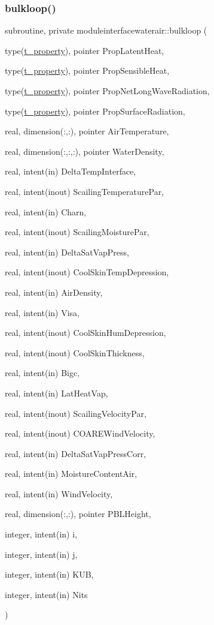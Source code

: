 \subsubsection{\texorpdfstring{bulkloop()}{bulkloop()}}
{\footnotesize\ttfamily subroutine, private moduleinterfacewaterair\+::bulkloop (\begin{DoxyParamCaption}\item[{type(\mbox{\hyperlink{structmoduleinterfacewaterair_1_1t__property}{t\+\_\+property}}), pointer}]{Prop\+Latent\+Heat,  }\item[{type(\mbox{\hyperlink{structmoduleinterfacewaterair_1_1t__property}{t\+\_\+property}}), pointer}]{Prop\+Sensible\+Heat,  }\item[{type(\mbox{\hyperlink{structmoduleinterfacewaterair_1_1t__property}{t\+\_\+property}}), pointer}]{Prop\+Net\+Long\+Wave\+Radiation,  }\item[{type(\mbox{\hyperlink{structmoduleinterfacewaterair_1_1t__property}{t\+\_\+property}}), pointer}]{Prop\+Surface\+Radiation,  }\item[{real, dimension(\+:,\+:), pointer}]{Air\+Temperature,  }\item[{real, dimension(\+:,\+:,\+:), pointer}]{Water\+Density,  }\item[{real, intent(in)}]{Delta\+Temp\+Interface,  }\item[{real, intent(inout)}]{Scailing\+Temperature\+Par,  }\item[{real, intent(in)}]{Charn,  }\item[{real, intent(inout)}]{Scailing\+Moisture\+Par,  }\item[{real, intent(in)}]{Delta\+Sat\+Vap\+Press,  }\item[{real, intent(inout)}]{Cool\+Skin\+Temp\+Depression,  }\item[{real, intent(in)}]{Air\+Density,  }\item[{real, intent(in)}]{Visa,  }\item[{real, intent(inout)}]{Cool\+Skin\+Hum\+Depression,  }\item[{real, intent(inout)}]{Cool\+Skin\+Thickness,  }\item[{real, intent(in)}]{Bigc,  }\item[{real, intent(in)}]{Lat\+Heat\+Vap,  }\item[{real, intent(inout)}]{Scailing\+Velocity\+Par,  }\item[{real, intent(inout)}]{C\+O\+A\+R\+E\+Wind\+Velocity,  }\item[{real, intent(in)}]{Delta\+Sat\+Vap\+Press\+Corr,  }\item[{real, intent(in)}]{Moisture\+Content\+Air,  }\item[{real, intent(in)}]{Wind\+Velocity,  }\item[{real, dimension(\+:,\+:), pointer}]{P\+B\+L\+Height,  }\item[{integer, intent(in)}]{i,  }\item[{integer, intent(in)}]{j,  }\item[{integer, intent(in)}]{K\+UB,  }\item[{integer, intent(in)}]{Nits }\end{DoxyParamCaption})\hspace{0.3cm}{\ttfamily [private]}}

